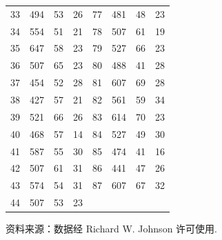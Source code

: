 \begin{mvtable}
\begin{longtable}{rrrrrrrr}
33 & 494 & 53 & 26 & 77 & 481 & 48 & 23\\
34 & 554 & 51 & 21 & 78 & 507 & 61 & 19\\
35 & 647 & 58 & 23 & 79 & 527 & 66 & 23\\
36 & 507 & 65 & 23 & 80 & 488 & 41 & 28\\
37 & 454 & 52 & 28 & 81 & 607 & 69 & 28\\
38 & 427 & 57 & 21 & 82 & 561 & 59 & 34\\
39 & 521 & 66 & 26 & 83 & 614 & 70 & 23\\
40 & 468 & 57 & 14 & 84 & 527 & 49 & 30\\
41 & 587 & 55 & 30 & 85 & 474 & 41 & 16\\
42 & 507 & 61 & 31 & 86 & 441 & 47 & 26\\
43 & 574 & 54 & 31 & 87 & 607 & 67 & 32\\
44 & 507 & 53 & 23 & & & & \\
\end{longtable}

资料来源：数据经 Richard W. Johnson 许可使用.
\end{mvtable}
